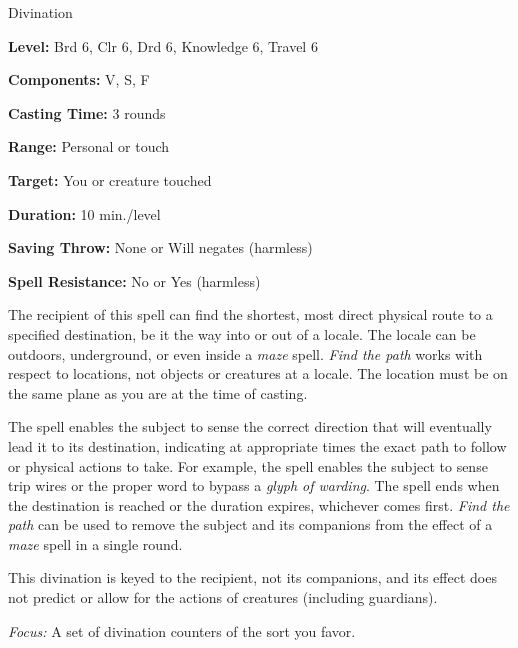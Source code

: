 
Divination

\textbf{Level:} Brd 6, Clr 6, Drd 6, Knowledge 6, Travel 6

\textbf{Components:} V, S, F

\textbf{Casting Time:} 3 rounds

\textbf{Range:} Personal or touch

\textbf{Target:} You or creature touched

\textbf{Duration:} 10 min./level

\textbf{Saving Throw:} None or Will negates (harmless)

\textbf{Spell Resistance:} No or Yes (harmless)

The recipient of this spell can find the shortest, most direct physical route to 
a specified destination, be it the way into or out of a locale. The locale can 
be outdoors, underground, or even inside a \textit{maze} spell. \textit{Find the 
path} works with respect to locations, not objects or creatures at a locale. The 
location must be on the same plane as you are at the time of casting.

The spell enables the subject to sense the correct direction that will eventually 
lead it to its destination, indicating at appropriate times the exact path to follow 
or physical actions to take. For example, the spell enables the subject to sense 
trip wires or the proper word to bypass a \textit{glyph of warding}. The spell 
ends when the destination is reached or the duration expires, whichever comes first. 
\textit{Find the path} can be used to remove the subject and its companions from 
the effect of a \textit{maze} spell in a single round.

This divination is keyed to the recipient, not its companions, and its effect does 
not predict or allow for the actions of creatures (including guardians).

\textit{Focus:} A set of divination counters of the sort you favor.

